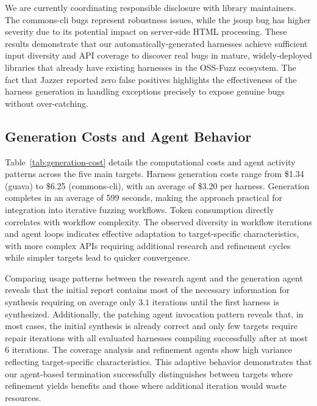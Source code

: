 We are currently coordinating responsible disclosure with library maintainers. The commons-cli bugs represent robustness issues, while the jsoup bug has higher severity due to its potential impact on server-side HTML processing.
These results demonstrate that our automatically-generated harnesses achieve sufficient input diversity and API coverage to discover real bugs in mature, widely-deployed libraries that already have existing harnesses in the OSS-Fuzz ecosystem. The fact that Jazzer reported zero false positives highlights the effectiveness of the harness generation in handling exceptions precisely to expose genuine bugs without over-catching.
%

\subsection{Generation Costs and Agent Behavior}%
\label{subsec:generation-costs}
%
%
Table~\ref{tab:generation-cost} details the computational costs and agent activity patterns across the five main targets. Harness generation costs range from \$1.34 (guava) to \$6.25 (commons-cli), with an average of \$3.20 per harness. Generation completes in an average of 599 seconds, making the approach practical for integration into iterative fuzzing workflows.
Token consumption directly correlates with workflow complexity. The observed diversity in workflow iterations and agent loops indicates effective adaptation to target-specific characteristics, with more complex APIs requiring additional research and refinement cycles while simpler targets lead to quicker convergence. 
\par
Comparing usage patterns between the research agent and the generation agent reveals that the initial report contains most of the necessary information for synthesis requiring on average only $3.1$ iterations until the first harness is synthesized. Additionally, the patching agent invocation pattern reveals that, in most cases, the initial synthesis is already correct and only few targets require repair iterations with all evaluated harnesses compiling successfully after at most $6$ iterations.
The coverage analysis and refinement agents show high variance reflecting target-specific characteristics.
This adaptive behavior demonstrates that our agent-based termination successfully distinguishes between targets where refinement yields benefits and those where additional iteration would waste resources.




